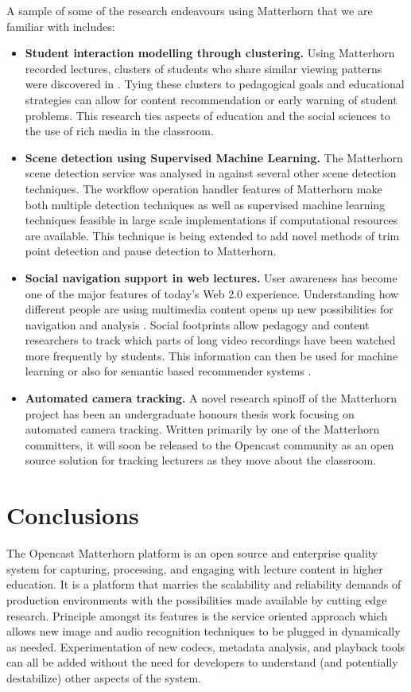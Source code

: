 \documentclass{sig-alternate}
\begin{document}
A sample of some of the research endeavours using Matterhorn that we are familiar with includes:
\begin{itemize}
\item \textbf{Student interaction modelling through clustering.}   Using Matterhorn recorded lectures, clusters of students who share similar viewing patterns were discovered in \cite{Brooks2010}.  Tying these clusters to pedagogical goals and educational strategies can allow for content recommendation or early warning of student problems.  This research ties aspects of education and the social sciences to the use of rich media in the classroom. 
\item \textbf{Scene detection using Supervised Machine Learning.}  The Matterhorn scene detection service was analysed in \cite{Johnston2011} against several other scene detection techniques.  The workflow operation handler features of Matterhorn make both multiple detection techniques as well as supervised machine learning techniques feasible in large scale implementations if computational resources are available.  This technique is being extended to add novel methods of trim point detection and pause detection to Matterhorn.
\item \textbf{Social navigation support in web lectures.} User awareness has become one of the major features of today's Web 2.0 experience. Understanding how different people are using multimedia content opens up new possibilities for navigation and analysis \cite{KMV09}. Social footprints allow pedagogy and content researchers to track which parts of long video recordings have been watched more frequently by students. This information can then be used for machine learning or also for semantic based recommender systems \cite{Ketterl:2010:USN:1912600.1912699}.
\item \textbf{Automated camera tracking.} A novel research spinoff of the Matterhorn project has been an undergraduate honours thesis work focusing on automated camera tracking.  Written primarily by one of the Matterhorn committers, it will soon be released to the Opencast community as an open source solution for tracking lecturers as they move about the classroom.
\end{itemize}

\section{Conclusions}
The Opencast Matterhorn platform is an open source and enterprise quality system for capturing, processing, and engaging with lecture content in higher education.  It is a platform that marries the scalability and reliability demands of production environments with the possibilities made available by cutting edge research.  Principle amongst its features is the service oriented approach which allows new image and audio recognition techniques to be plugged in dynamically as needed.  Experimentation of new codecs, metadata analysis, and playback tools can all be added without the need for developers to understand (and potentially destabilize) other aspects of the system.
\end{document}
